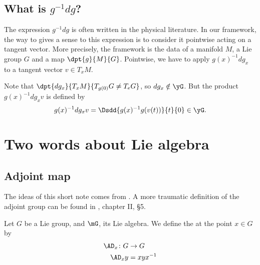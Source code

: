 \subsection{What is  \texorpdfstring{$g^{-1} dg$}{g-1dg}?}\label{SubSecgmudg}

The expression $g^{-1} dg$ is often written in the physical literature. In our framework, the way to gives a sense to this expression is to consider it pointwise acting on a tangent vector. More precisely, the framework is the data of a manifold $M$, a Lie group $G$ and a map $\dpt{g}{M}{G}$. Pointwise, we have to apply $g(x)^{-1} dg_x$ to a tangent vector $v\in T_xM$.

Note that $\dpt{dg_x}{T_xM}{T_{g(0)}G\neq T_eG}$, so $dg_x\notin \yG$. But the product $g(x)^{-1} dg_x v$ is defined by
\begin{equation}
	g(x)^{-1} dg_x v=\Dsdd{ g(x)^{-1} g(v(t)) }{t}{0}\in\yG.
\end{equation}


\section{Two words about Lie algebra}


\subsection{Adjoint map}

The ideas of this short note comes from \cite{Lie}. A more traumatic definition of the adjoint group can be found in \cite{Helgason}, chapter II, \S 5. 

\begin{definition}
    Let $G$ be a Lie group, and $\mG$, its Lie algebra. We define the  at the point $x\in G$ by
    \begin{equation}
        \begin{aligned}
            \AD_x\colon G&\to G \\
            \AD_xy&=xyx^{-1}
        \end{aligned}
    \end{equation}
\end{definition}

